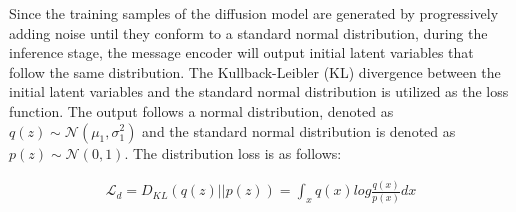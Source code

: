 Since the training samples of the diffusion model are generated by progressively adding noise until they conform to a standard normal distribution, during the inference stage, the message encoder will output initial latent variables that follow the same distribution. The Kullback-Leibler (KL) divergence between the initial latent variables and the standard normal distribution is utilized as the loss function. The output follows a normal distribution, denoted as $q(z) \sim \mathcal{N}(\mu_1, \sigma_1^2)$ and the standard normal distribution is denoted as $p(z) \sim \mathcal{N}(0, 1)$. The distribution loss is as follows:

\begin{equation}
\begin{aligned}
    \mathcal{L}_d=D_{KL}(q(z)||p(z))
=\int_xq(x)log\frac{q(x)}{p(x)}dx
\end{aligned}
\end{equation}







